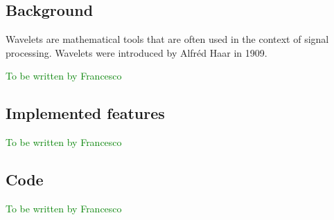 \subsection{Background}
Wavelets are mathematical tools that are often used in the context of signal processing. Wavelets were introduced by Alfréd Haar in 1909\cite{haar}.

\textcolor{green}{To be written by Francesco}

\subsection{Implemented features}
\textcolor{green}{To be written by Francesco}

\subsection{Code}
\textcolor{green}{To be written by Francesco}